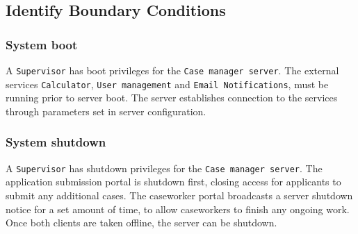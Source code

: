 \subsection{Identify Boundary Conditions}
    \subsubsection{System boot}
    A \texttt{Supervisor} has boot privileges for the \texttt{Case manager server}. The external services \texttt{Calculator}, \texttt{User management} and \texttt{Email Notifications}, must be running prior to server boot. The server establishes connection to the services through parameters set in server configuration.
    
    \subsubsection{System shutdown}
    A \texttt{Supervisor} has shutdown privileges for the \texttt{Case manager server}. The application submission portal is shutdown first, closing access for applicants to submit any additional cases. The caseworker portal broadcasts a server shutdown notice for a set amount of time, to allow caseworkers to finish any ongoing work. Once both clients are taken offline, the server can be shutdown.
